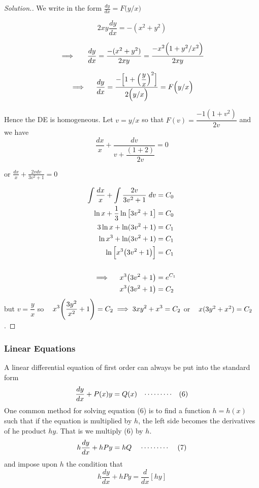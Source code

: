 \documentclass[11pt,a4paper]{article}
\theoremstyle{definition}
\newenvironment{solution}
  {\renewcommand{\qedsymbol}{}\begin{proof}[\textit{Solution}.]}
  {\end{proof}}
\begin{document}
\begin{solution}


We write in the form $\displaystyle{\frac{dy}{dx} = F\big(y/x\big)}$

$$2xy\frac{dy}{dx} = - (x^2 + y^2)$$

$$\implies \hspace{0.5cm} \frac{dy}{dx} = \frac{-(x^2 + y^2)}{2xy} = \frac{-x^2\Big(1 + y^2/x^2\Big)}{2xy}$$

$$\implies\hspace{0.4cm} \frac{dy}{dx} = \frac{-\Big[1 + \Big(\dfrac{y}{x}\Big)^2\Big]}{2\Big(y/x\Big)} = F\Big(y/x\Big)$$

Hence the DE is homogeneous. Let $v = y/x$ so that $\displaystyle{F(v) = \dfrac{-1(1 + v^2)}{2v}}$ and we have $$\frac{dx}{x} + \frac{dv}{v + \dfrac{(1+2)}{2v}} = 0$$

or $\displaystyle{\frac{dx}{x} + \frac{2vdv}{3v^2 + 1}  = 0}$

\begin{align*}
\int \frac{dx}{x} + \int \frac{2v}{3v^2 + 1}\hspace{0.1cm}dv & = C_0\\
\ln x + \dfrac{1}{3} \ln \big[3v^2 + 1\big] & = C_0\\
3\ln x + \ln (3v^2 + 1) & = C_1\\
\ln x^3 + \ln (3v^2 + 1) & = C_1\\
\ln\Big[x^3\big(3v^2+1\big)\Big] & = C_1\\\\
\implies \hspace{0.4cm} x^3\big(3v^2 + 1 \big) & = e^{C_1}\\
x^3\big(3v^2 + 1\big) & = C_2\\
\end{align*}
but $ v = \dfrac{y}{x} $ so $\hspace{0.3cm} \displaystyle{x^3\Bigg(\dfrac{3y^2}{x^2} + 1 \Bigg) = C_2} \implies 3xy^2 + x^3 = C_2$ or $\hspace{0.3cm} x(3y^2 +x^2) = C_2$.


\pagebreak
\end{solution}
\subsubsection{Linear Equations}
A linear differential equation of first order can always be put into the standard form $$\frac{dy}{dx} + P(x)y = Q(x)\hspace{0.3cm} \cdots\cdots\cdots\hspace{0.3cm} (6)$$
One common method for solving equation (6) is to find a function $h = h(x)$ such that if the equation is multiplied by $h$, the left side becomes the derivatives of he product $hy$. That is we multiply (6) by $h$.
$$h\frac{dy}{dx} + h Py = hQ\hspace{0.4cm} \cdots\cdots\cdots\hspace{0.4cm} (7)$$ and impose upon $h$ the condition that 
$$h\dfrac{dy}{dx} + hPy = \frac{d}{dx}[hy]$$
\end{document}
